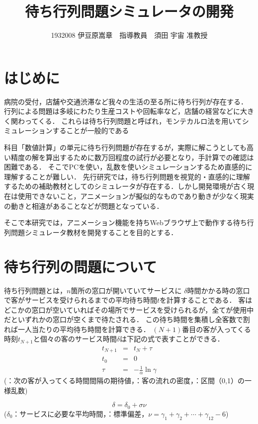 \documentclass[twocolumn,10pt,a4j]{ltjsarticle}
\title{待ち行列問題シミュレータの開発}
\author{1932008 伊豆原嵩章　指導教員　須田 宇宙 准教授}
\date{}
\begin{document}
\maketitle

\section{はじめに}
病院の受付，店舗や交通渋滞など我々の生活の至る所に待ち行列が存在する．
行列による問題は多岐にわたり生産コストや回転率など，店舗の経営などに大きく関わってくる．
これらは待ち行列問題と呼ばれ，モンテカルロ法を用いてシミュレーションすることが一般的である

科目「数値計算」の単元に待ち行列問題が存在するが，実際に解こうとしても高い精度の解を算出するために数万回程度の試行が必要となり，手計算での確認は困難である．
そこでPCを使い，乱数を使いシミュレーションするため直感的に理解することが難しい．
先行研究では，待ち行列問題を視覚的・直感的に理解するための補助教材としてのシミュレータが存在する\cite{past}．しかし開発環境が古く現在は使用できないこと，アニメーションが擬似的なものであり動きが少なく現実の動きと相違があることなどが問題となっている．

そこで本研究では，アニメーション機能を持ちWebブラウザ上で動作する待ち行列問題シミュレータ教材を開発することを目的とする．

\section{待ち行列の問題について}
待ち行列問題とは，$n$箇所の窓口が開いていてサービスに $\delta$時間かかる時の窓口で客がサービスを受けられるまでの平均待ち時間$t$を計算することである．
客はどこかの窓口が空いていればその場所でサービスを受けられるが，全てが使用中だといずれかの窓口が空くまで待たされる．
この待ち時間を集積し全客数で割れば一人当たりの平均待ち時間を計算できる．
$(N+1)$番目の客が入ってくる時刻$t_{N+1}$と個々の客のサービス時間$\delta$は下記の式で表すことができる\cite{text}．
\vspace{-4mm}
\begin{eqnarray}
t_{N+1} & = & t_N+\tau\\
t_0 & = & 0\\
\tau & = & -\frac{1}{\alpha}\ln\gamma
\end{eqnarray}
(\tau：次の客が入ってくる時間間隔の期待値，\alpha：客の流れの密度，\gamma：区間（0,1）の一様乱数)

\begin{equation}
\delta=\delta_0+\sigma\nu
\end{equation}
\vspace{-1mm}
($\delta_0$：サービスに必要な平均時間，\sigma：標準偏差，$\nu=\gamma_1+\gamma_2+\cdots+\gamma_{12}-6$)
\end{document}
